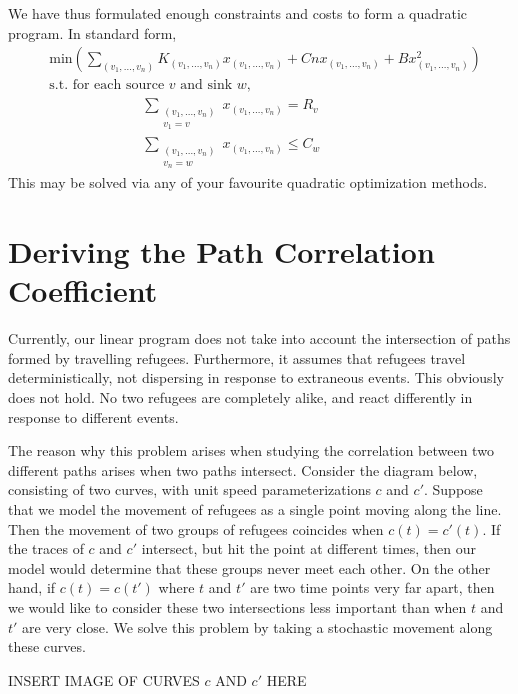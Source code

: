 \documentclass{article}
\begin{document}
We have thus formulated enough constraints and costs to form a quadratic program.  In standard form,
%
\begin{align*}
    &\text{min} \left( \sum_{(v_1, \dots, v_n)} K_{(v_1, \dots, v_n)} x_{(v_1, \dots, v_n)} + Cn x_{(v_1, \dots, v_n)} + B x_{(v_1, \dots, v_n)}^2 \right)\\
    &\text{s.t. for each source $v$ and sink $w$,}\\
    &\ \ \ \ \ \ \ \ \ \ \ \ \ \ \ \ \ \ \ \ \ \ \ \ \ \ \ \ \ \ \sum_{\substack{(v_1, \dots, v_n) \\ v_1 = v}} x_{(v_1, \dots, v_n)} = R_v\\
    &\ \ \ \ \ \ \ \ \ \ \ \ \ \ \ \ \ \ \ \ \ \ \ \ \ \ \ \ \ \ \sum_{\substack{(v_1, \dots, v_n) \\ v_n = w}} x_{(v_1, \dots, v_n)} \leq C_w
\end{align*}
%
This may be solved via any of your favourite quadratic optimization methods.

\section{Deriving the Path Correlation Coefficient}

Currently, our linear program does not take into account the intersection of paths formed by travelling refugees. Furthermore, it assumes that refugees travel deterministically, not dispersing in response to extraneous events. This obviously does not hold. No two refugees are completely alike, and react differently in response to different events.

The reason why this problem arises when studying the correlation between two different paths arises when two paths intersect. Consider the diagram below, consisting of two curves, with unit speed parameterizations $c$ and $c'$. Suppose that we model the movement of refugees as a single point moving along the line. Then the movement of two groups of refugees coincides when $c(t) = c'(t)$. If the traces of $c$ and $c'$ intersect, but hit the point at different times, then our model would determine that these groups never meet each other. On the other hand, if $c(t) = c(t')$ where $t$ and $t'$ are two time points very far apart, then we would like to consider these two intersections less important than when $t$ and $t'$ are very close. We solve this problem by taking a stochastic movement along these curves.

INSERT IMAGE OF CURVES $c$ AND $c'$ HERE
\end{document}
